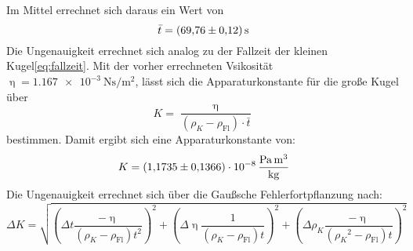  Im Mittel errechnet sich daraus ein Wert von
 \begin{equation*}
   \bar{t} = \SI{69.76\pm0.12}{\second}
 \end{equation*}
 Die Ungenauigkeit errechnet sich analog zu der Fallzeit der kleinen Kugel\eqref{eq:fallzeit}.
 Mit der vorher errechneten Vsikosität $\upeta=\SI{1.167e-3}{\newton\second\per\meter\squared}$, lässt sich die Apparaturkonstante für die große Kugel über
 \begin{equation*}
   K =\frac{\upeta}{(\rho_K - \rho_\text{Fl})\cdot \bar{t}}
 \end{equation*}
 bestimmen.
 Damit ergibt sich eine Apparaturkonstante von:
 \begin{equation*}
   K=\SI{1.1735\pm 0.1366 e-8}{\pascal\cubic\meter\per\kilo\gram}
 \end{equation*}
 Die Ungenauigkeit errechnet sich über die Gaußsche Fehlerfortpflanzung nach:
 \begin{equation*}
   \Delta K = \sqrt{(\Delta t \frac{- \upeta}{(\rho_K - \rho_\text{Fl})t^2})^2 +(\Delta \upeta \frac{1}{(\rho_K - \rho_\text{Fl})t})^2 + (\Delta \rho_K \frac{-\upeta}{({\rho_K}^2 - \rho_\text{Fl})t})^2}
 \end{equation*}
%
